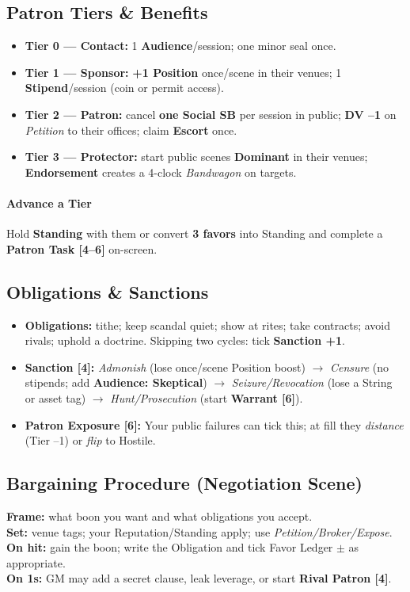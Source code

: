   \subsection{Patron Tiers \& Benefits}
  \begin{itemize}
    \item \textbf{Tier 0 --- Contact:} 1 \textbf{Audience}/session; one minor seal once.
    \item \textbf{Tier 1 --- Sponsor:} \textbf{+1 Position} once/scene in their venues; 1 \textbf{Stipend}/session (coin or permit access).
    \item \textbf{Tier 2 --- Patron:} cancel \textbf{one Social SB} per session in public; \textbf{DV --1} on \emph{Petition} to their offices; claim \textbf{Escort} once.
    \item \textbf{Tier 3 --- Protector:} start public scenes \textbf{Dominant} in their venues; \textbf{Endorsement} creates a 4-clock \emph{Bandwagon} on targets.
  \end{itemize}
  \paragraph{Advance a Tier} Hold \textbf{Standing} with them or convert \textbf{3 favors} into Standing and complete a \textbf{Patron Task [4--6]} on-screen.
  
  \subsection{Obligations \& Sanctions}
  \begin{itemize}
    \item \textbf{Obligations:} tithe; keep scandal quiet; show at rites; take contracts; avoid rivals; uphold a doctrine. Skipping two cycles: tick \textbf{Sanction +1}.
    \item \textbf{Sanction [4]:} \emph{Admonish} (lose once/scene Position boost) $\to$ \emph{Censure} (no stipends; add \textbf{Audience: Skeptical}) $\to$ \emph{Seizure/Revocation} (lose a String or asset tag) $\to$ \emph{Hunt/Prosecution} (start \textbf{Warrant [6]}).
    \item \textbf{Patron Exposure [6]:} Your public failures can tick this; at fill they \emph{distance} (Tier --1) or \emph{flip} to Hostile.
  \end{itemize}
  
  \subsection{Bargaining Procedure (Negotiation Scene)}
  \textbf{Frame:} what boon you want and what obligations you accept.\\
  \textbf{Set:} venue tags; your Reputation/Standing apply; use \emph{Petition/Broker/Expose}.\\
  \textbf{On hit:} gain the boon; write the Obligation and tick Favor Ledger $\pm$ as appropriate.\\
  \textbf{On 1s:} GM may add a secret clause, leak leverage, or start \textbf{Rival Patron [4]}.
  
